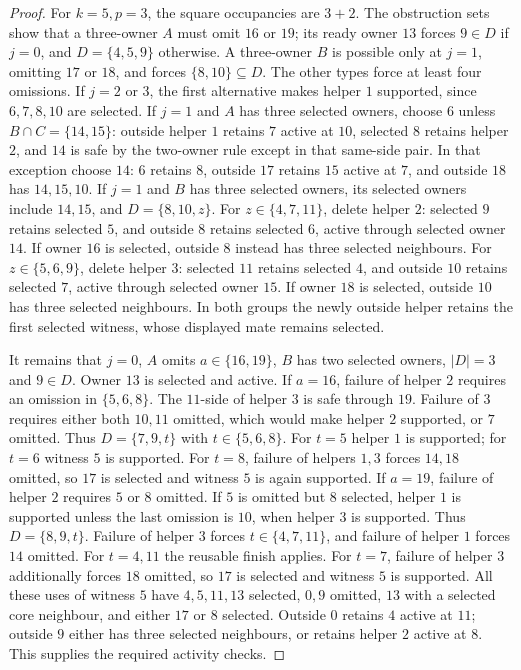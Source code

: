 \begin{proof}
For $k=5,p=3$, the square occupancies are $3+2$. The obstruction sets show
that a three-owner $A$ must omit $16$ or $19$; its ready owner $13$ forces
$9\in D$ if $j=0$, and $D=\{4,5,9\}$ otherwise. A three-owner $B$ is
possible only at $j=1$, omitting $17$ or $18$, and forces $\{8,10\}\subseteq D$.
The other types force at least four omissions. If $j=2$ or $3$, the first
alternative makes helper $1$ supported, since $6,7,8,10$ are selected.
If $j=1$ and $A$ has three selected owners, choose $6$ unless
$B\cap C=\{14,15\}$: outside helper $1$ retains $7$ active at $10$,
selected $8$ retains helper $2$, and $14$ is safe by the two-owner rule
except in that same-side pair. In that exception choose $14$: $6$ retains
$8$, outside $17$ retains $15$ active at $7$, and outside $18$ has $14,15,10$.
If $j=1$ and $B$ has three selected owners, its selected owners include
$14,15$, and $D=\{8,10,z\}$.
For $z\in\{4,7,11\}$, delete helper $2$: selected $9$ retains selected
$5$, and outside $8$ retains selected $6$, active through selected owner
$14$. If owner $16$ is selected, outside $8$ instead has three selected
neighbours. For $z\in\{5,6,9\}$, delete helper $3$: selected $11$ retains
selected $4$, and outside $10$ retains selected $7$, active through selected
owner $15$. If owner $18$ is selected, outside $10$ has three selected
neighbours. In both groups the newly outside helper retains the first
selected witness, whose displayed mate remains selected.

It remains that $j=0$, $A$ omits $a\in\{16,19\}$, $B$ has two selected
owners, $|D|=3$ and $9\in D$. Owner $13$ is selected and active.
If $a=16$, failure of helper $2$ requires an omission in $\{5,6,8\}$.
The $11$-side of helper $3$ is safe through $19$. Failure of $3$ requires
either both $10,11$ omitted, which would make helper $2$ supported, or $7$
omitted. Thus $D=\{7,9,t\}$ with $t\in\{5,6,8\}$.
For $t=5$ helper $1$ is supported; for $t=6$ witness $5$ is supported.
For $t=8$, failure of helpers $1,3$ forces $14,18$ omitted, so $17$ is
selected and witness $5$ is again supported.
If $a=19$, failure of helper $2$ requires $5$ or $8$ omitted. If $5$ is
omitted but $8$ selected, helper $1$ is supported unless the last omission
is $10$, when helper $3$ is supported. Thus $D=\{8,9,t\}$.
Failure of helper $3$ forces $t\in\{4,7,11\}$, and failure of helper $1$
forces $14$ omitted. For $t=4,11$ the reusable finish applies. For $t=7$,
failure of helper $3$ additionally forces $18$ omitted, so $17$ is selected
and witness $5$ is supported. All these uses of witness $5$ have
$4,5,11,13$ selected, $0,9$ omitted, $13$ with a selected core neighbour,
and either $17$ or $8$ selected. Outside $0$ retains $4$ active at $11$;
outside $9$ either has three selected neighbours, or retains helper $2$
active at $8$. This supplies the required activity checks.


\end{proof}
